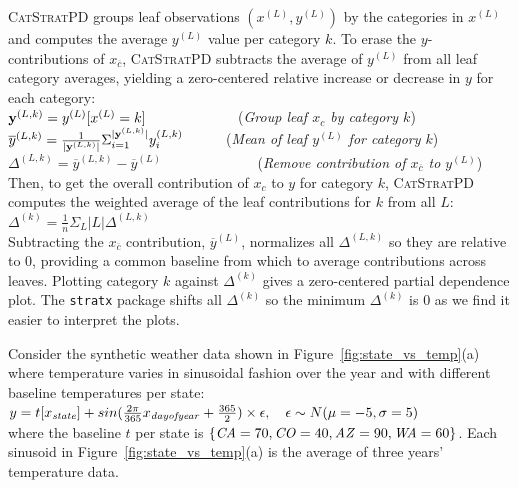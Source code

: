 \documentclass[12pt]{article}
\newcommand{\figref}[1]{Figure~\ref{#1}}
\newcommand{\cspd}{\fontfamily{cmr}\textsc{\small CatStratPD}}
\newcommand{\xnc}{$x_{\overline{c}}$}
\begin{document}
\cspd{} groups leaf observations $(x^{(L)}, y^{(L)})$ by the categories in $x^{(L)}$ and computes the average $y^{(L)}$ value per category $k$. To erase the $y$-contributions of \xnc{}, \cspd{} subtracts the average of $y^{(L)}$ from all leaf category averages, yielding a zero-centered relative increase or decrease in $y$ for each category:\\

\noindent ${\bf y}^{(L,k)} = y^{(L)}[x^{(L)}=k]$~~~~~~~~~~~~~({\it Group leaf $x_c$ by category $k$})\\
$\overline{y}^{(L,k)} = \frac{1}{|{\bf y}^{(L,k)}|} \Sigma_{i=1}^{|{\bf y}^{(L,k)}|} y_i^{(L,k)}$ ~~~~\,~({\it Mean of leaf $y^{(L)}$ for category $k$})\\
$\Delta^{(L,k)} = \overline{y}^{(L,k)} - \overline{y}^{(L)}$ ~~~~~~~~~~~~~({\it Remove contribution of $x_{\overline{c}}$ to $y^{(L)}$})\\

\noindent Then, to get the overall contribution of $x_c$ to $y$ for category $k$, \cspd{} computes the weighted average of the leaf contributions for $k$ from all $L$:\\

\noindent $\Delta^{(k)} = \frac{1}{n} \Sigma_{L} |L|\Delta^{(L,k)}$\\

\noindent Subtracting the \xnc{} contribution, $\overline{y}^{(L)}$, normalizes all $\Delta^{(L,k)}$ so they are relative to 0, providing a common baseline from which to average contributions across leaves. Plotting category $k$ against $\Delta^{(k)}$ gives a zero-centered partial dependence plot. The {\tt stratx} package shifts all $\Delta^{(k)}$ so the minimum $\Delta^{(k)}$ is 0 as we find it easier to interpret the plots.

Consider the synthetic weather data shown in \figref{fig:state_vs_temp}(a) where temperature varies in sinusoidal fashion over the year and with different baseline temperatures per state:\\

$y = t[x_{\it state}] + sin(\frac{2 \pi}{365} x_{\it dayofyear} + \frac{365}{2}) \times \epsilon, ~~~ \epsilon \sim N(\mu=-5,\sigma=5)$\\

\noindent where the baseline $t$ per state is $\{{\it CA}=70, {\it CO}=40, {\it AZ}=90, {\it WA}=60\}$. Each sinusoid in \figref{fig:state_vs_temp}(a) is the average of three years' temperature data.
\end{document}
